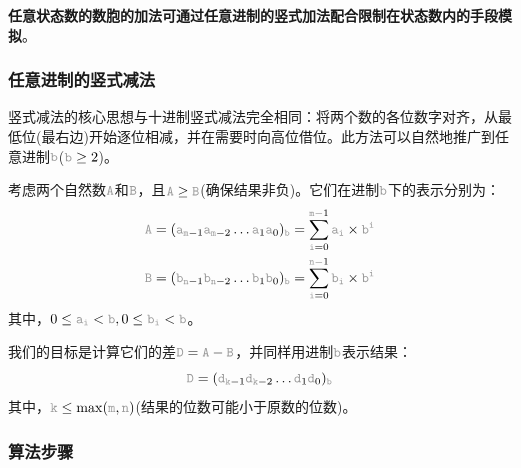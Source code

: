 \documentclass[12pt,a4paper,UTF8]{ctexart}
\newcommand{\var}[1]{\textcolor{lightgray}{\mathtt{#1}}}
\begin{document}
\textbf{任意状态数的数胞的加法可通过任意进制的竖式加法配合限制在状态数内的手段模拟}。

\subsubsection{任意进制的竖式减法}

\qquad 竖式减法的核心思想与十进制竖式减法完全相同：将两个数的各位数字对齐，从最低位(最右边)开始逐位相减，并在需要时向高位借位。此方法可以自然地推广到任意进制$\var{b}$($\var{b} \ge 2$)。

\qquad 考虑两个自然数$\var{A}$和$\var{B}$，且$\var{A} \ge \var{B}$(确保结果非负)。它们在进制$\var{b}$下的表示分别为：
\begin{align*}
    \var{A} &= (\var{a}_{\var{m}-1}\var{a}_{\var{m}-2}\dots\var{a}_1\var{a}_0)_{\var{b}} = \sum_{\var{i}=0}^{\var{m}-1}\var{a}_{\var{i}} \times \var{b}^{\var{i}} \\
    \var{B} &= (\var{b}_{\var{n}-1}\var{b}_{\var{n}-2}\dots\var{b}_1\var{b}_0)_{\var{b}} = \sum_{\var{i}=0}^{\var{n}-1}\var{b}_{\var{i}} \times \var{b}^{\var{i}}
\end{align*}
其中，$0 \le \var{a}_{\var{i}} < \var{b}, 0 \le \var{b}_{\var{i}} < \var{b}$。

\qquad 我们的目标是计算它们的差$\var{D} = \var{A} - \var{B}$，并同样用进制$\var{b}$表示结果：
\[\var{D} = (\var{d}_{\var{k}-1}\var{d}_{\var{k}-2}\dots\var{d}_1\var{d}_0)_{\var{b}}\]
其中，$\var{k} \le \max(\var{m}, \var{n})$(结果的位数可能小于原数的位数)。

\subsubsection*{算法步骤}
\end{document}
